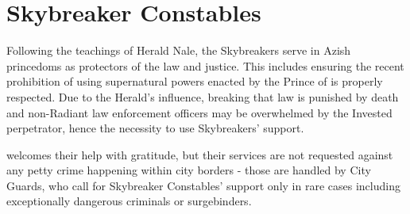 \section{Skybreaker Constables}
\label{enemyFractionSkybreakers}

Following the teachings of Herald Nale, the Skybreakers serve in Azish princedoms as protectors of the law and justice. This includes ensuring the recent prohibition of using supernatural powers enacted by the Prince of \locationTashikk{} is properly respected. Due to the Herald’s influence, breaking that law is punished by death and non-Radiant law enforcement officers may be overwhelmed by the Invested perpetrator, hence the necessity to use Skybreakers’ support.

\locationYeddaw{} welcomes their help with gratitude, but their services are not requested against any petty crime happening within city borders - those are handled by City Guards, who call for Skybreaker Constables’ support only in rare cases including exceptionally dangerous criminals or surgebinders.\\





\newpage

\newpage

\newpage
